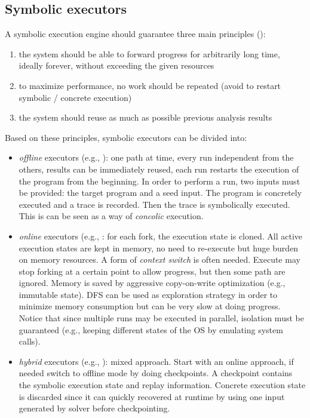 \documentclass[10pt, a4paper]{article}
\begin{document}
\subsection{Symbolic executors}
A symbolic execution engine should guarantee three main principles (\cite{MAYHEM-SP12}):
\begin{enumerate}
  \item the system should be able to forward progress for arbitrarily long time, ideally forever, without exceeding the given resources
  \item to maximize performance, no work should be repeated (avoid to restart symbolic / concrete execution)
  \item the system should reuse as much as possible previous analysis results
\end{enumerate}

Based on these principles, symbolic executors can be divided into:
\begin{itemize}
  \item {\em offline} executors (e.g., \cite{SAGE-NDSS08}): one path at time, every run independent from the others, results can be immediately reused, each run restarts the execution of the program from the beginning. In order to perform a run, two inputs must be provided: the target program and a seed input. The program is concretely executed and a trace is recorded. Then the trace is symbolically executed. This is can be seen as a way of {\em concolic} execution.
  \item {\em online} executors (e.g., \cite{KLEE-OSDI08,CKC-TOCS12,AEG-NDSS11}: for each fork, the execution state is cloned. All active execution states are kept in memory, no need to re-execute but huge burden on memory resources. A form of {\em context switch} is often needed. Execute may stop forking at a certain point to allow progress, but then some path are ignored. Memory is saved by aggressive copy-on-write optimization (e.g., immutable state). DFS can be used as exploration strategy in order to minimize memory consumption but can be very slow at doing progress. Notice that since multiple runs may be executed in parallel, isolation must be guaranteed (e.g., keeping different states of the OS by emulating system calls).
  \item {\em hybrid} executors (e.g., \cite{MAYHEM-SP12}): mixed approach. Start with an online approach, if needed switch to offline mode by doing checkpoints. A checkpoint contains the symbolic execution state and replay information. Concrete execution state is discarded since it can quickly recovered at runtime by using one input generated by solver before checkpointing.
\end{itemize}
\end{document}
